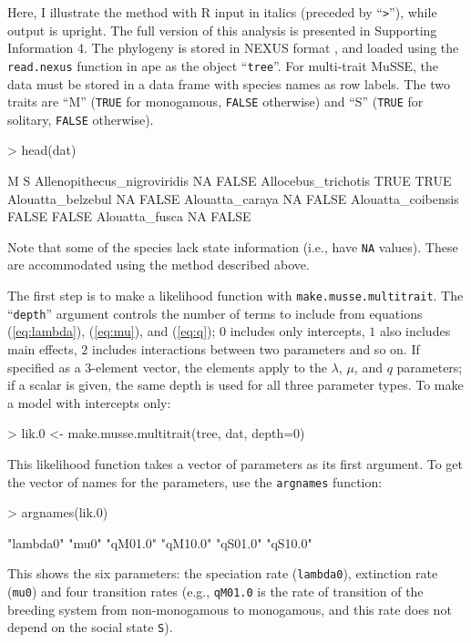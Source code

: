 \documentclass[12pt]{article}
\newenvironment{Schunk}{}{}
\newcommand\code\texttt
\begin{document}
Here, I illustrate the method with R input in italics (preceded by
``\texttt{>}''), while output is upright.  The full version of this
analysis is presented in Supporting Information 4.
%
The phylogeny is stored in NEXUS format \citep{Maddison-1997-590}, and
loaded using the \code{read.nexus} function in ape as the object
``\code{tree}''.
%
For multi-trait MuSSE, the data must be stored in a data frame with
species names as row labels.  The two traits are ``M'' (\code{TRUE}
for monogamous, \code{FALSE} otherwise) and ``S'' (\code{TRUE} for
solitary, \code{FALSE} otherwise).
\begin{Schunk}
\begin{Sinput}
> head(dat)
\end{Sinput}
\begin{Soutput}
                                M     S
Allenopithecus_nigroviridis    NA FALSE
Allocebus_trichotis          TRUE  TRUE
Alouatta_belzebul              NA FALSE
Alouatta_caraya                NA FALSE
Alouatta_coibensis          FALSE FALSE
Alouatta_fusca                 NA FALSE
\end{Soutput}
\end{Schunk}
Note that some of the species lack state information (i.e., have
\code{NA} values).  These are accommodated using the method described
above.

The first step is to make a likelihood function with
\code{make.musse.multitrait}.  
%
The ``\code{depth}'' argument controls the number of terms to include
from equations (\ref{eq:lambda}), (\ref{eq:mu}), and (\ref{eq:q}); $0$
includes only intercepts, $1$ also includes main effects, $2$ includes
interactions between two parameters and so on.  If specified as a
3-element vector, the elements apply to the $\lambda$, $\mu$, and $q$
parameters; if a scalar is given, the same depth is used for all three
parameter types.  To make a model with intercepts only:
\begin{Schunk}
\begin{Sinput}
> lik.0 <- make.musse.multitrait(tree, dat, depth=0)
\end{Sinput}
\end{Schunk}
This likelihood function takes a vector of parameters as its first
argument.  To get the vector of names for the parameters, use the
\code{argnames} function:
\begin{Schunk}
\begin{Sinput}
> argnames(lik.0)
\end{Sinput}
\begin{Soutput}
[1] "lambda0" "mu0"     "qM01.0"  "qM10.0"  "qS01.0"  "qS10.0"
\end{Soutput}
\end{Schunk}
This shows the six parameters: the speciation rate (\code{lambda0}),
extinction rate (\code{mu0}) and four transition rates (e.g.,
\code{qM01.0} is the rate of transition of the breeding system from
non-monogamous to monogamous, and this rate does not depend on the
social state \code{S}).
\end{document}
